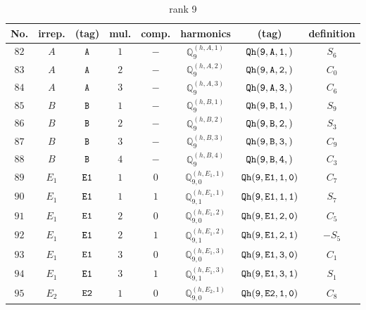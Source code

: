 \documentclass[fleqn,8pt]{jsarticle}
\begin{document}
\begin{table}[ht!]
\begin{center}
\caption{rank 9}
\renewcommand{\arraystretch}{1.3}
\begin{tabular}{cccccccc} \hline \hline
No. & irrep. & (tag) & mul. & comp. & harmonics & (tag) & definition \\ \hline
$ 82 $ & $ A $ & $ {\tt A} $ & $ 1 $ & $ - $ & $ \mathbb{Q}_{9}^{(h,A,1)} $ & $ {\tt Qh(9,A,1,)} $ & $ S_{6} $ \\
$ 83 $ & $ A $ & $ {\tt A} $ & $ 2 $ & $ - $ & $ \mathbb{Q}_{9}^{(h,A,2)} $ & $ {\tt Qh(9,A,2,)} $ & $ C_{0} $ \\
$ 84 $ & $ A $ & $ {\tt A} $ & $ 3 $ & $ - $ & $ \mathbb{Q}_{9}^{(h,A,3)} $ & $ {\tt Qh(9,A,3,)} $ & $ C_{6} $ \\
$ 85 $ & $ B $ & $ {\tt B} $ & $ 1 $ & $ - $ & $ \mathbb{Q}_{9}^{(h,B,1)} $ & $ {\tt Qh(9,B,1,)} $ & $ S_{9} $ \\
$ 86 $ & $ B $ & $ {\tt B} $ & $ 2 $ & $ - $ & $ \mathbb{Q}_{9}^{(h,B,2)} $ & $ {\tt Qh(9,B,2,)} $ & $ S_{3} $ \\
$ 87 $ & $ B $ & $ {\tt B} $ & $ 3 $ & $ - $ & $ \mathbb{Q}_{9}^{(h,B,3)} $ & $ {\tt Qh(9,B,3,)} $ & $ C_{9} $ \\
$ 88 $ & $ B $ & $ {\tt B} $ & $ 4 $ & $ - $ & $ \mathbb{Q}_{9}^{(h,B,4)} $ & $ {\tt Qh(9,B,4,)} $ & $ C_{3} $ \\
$ 89 $ & $ E_{1} $ & $ {\tt E1} $ & $ 1 $ & $ 0 $ & $ \mathbb{Q}_{9,0}^{(h,E_{1},1)} $ & $ {\tt Qh(9,E1,1,0)} $ & $ C_{7} $ \\
$ 90 $ & $ E_{1} $ & $ {\tt E1} $ & $ 1 $ & $ 1 $ & $ \mathbb{Q}_{9,1}^{(h,E_{1},1)} $ & $ {\tt Qh(9,E1,1,1)} $ & $ S_{7} $ \\
$ 91 $ & $ E_{1} $ & $ {\tt E1} $ & $ 2 $ & $ 0 $ & $ \mathbb{Q}_{9,0}^{(h,E_{1},2)} $ & $ {\tt Qh(9,E1,2,0)} $ & $ C_{5} $ \\
$ 92 $ & $ E_{1} $ & $ {\tt E1} $ & $ 2 $ & $ 1 $ & $ \mathbb{Q}_{9,1}^{(h,E_{1},2)} $ & $ {\tt Qh(9,E1,2,1)} $ & $ - S_{5} $ \\
$ 93 $ & $ E_{1} $ & $ {\tt E1} $ & $ 3 $ & $ 0 $ & $ \mathbb{Q}_{9,0}^{(h,E_{1},3)} $ & $ {\tt Qh(9,E1,3,0)} $ & $ C_{1} $ \\
$ 94 $ & $ E_{1} $ & $ {\tt E1} $ & $ 3 $ & $ 1 $ & $ \mathbb{Q}_{9,1}^{(h,E_{1},3)} $ & $ {\tt Qh(9,E1,3,1)} $ & $ S_{1} $ \\
$ 95 $ & $ E_{2} $ & $ {\tt E2} $ & $ 1 $ & $ 0 $ & $ \mathbb{Q}_{9,0}^{(h,E_{2},1)} $ & $ {\tt Qh(9,E2,1,0)} $ & $ C_{8} $ \\

\end{tabular}
\end{center}
\end{table}
\end{document}
